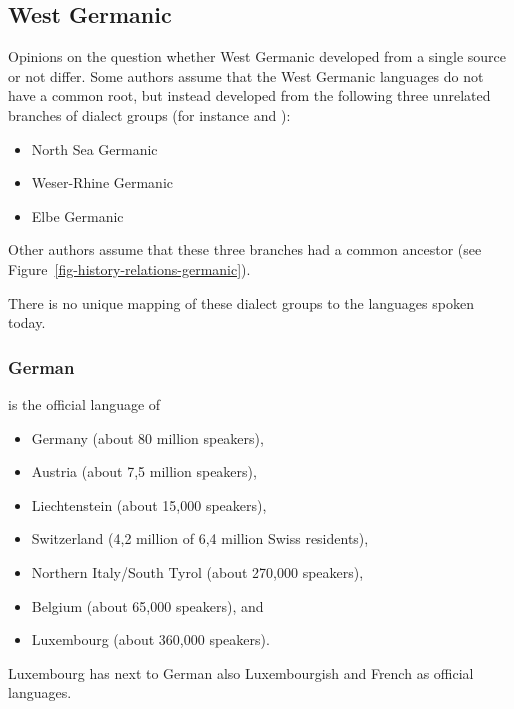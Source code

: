 \subsection{West Germanic}


Opinions on the question whether West Germanic developed from a single source or not differ. Some authors
assume that the West Germanic languages do not have a common root, but instead developed from the
following three unrelated branches of dialect groups (for instance \citealp[--18]{Robinson1992a-u} and
\citealp[]{HvDA94a}):
\begin{itemize}
\item North Sea Germanic %
\item Weser-Rhine Germanic %
\item Elbe Germanic %
\end{itemize}
Other authors assume that these three branches had a common ancestor (see Figure~\ref{fig-history-relations-germanic}).

There is no unique mapping of these dialect groups to the languages spoken today.





\subsubsection{German}

 is the official language of
\begin{itemize}
\item Germany (about 80 million speakers), 
\item Austria (about 7,5 million speakers), 
\item Liechtenstein (about 15,000 speakers), 
\item Switzerland (4,2 million of 6,4 million Swiss residents),
\item Northern Italy/South Tyrol (about 270,000 speakers), 
\item Belgium (about 65,000 speakers), and
\item Luxembourg (about 360,000 speakers).
\end{itemize}
Luxembourg has next to German also Luxembourgish and French as official
languages.

